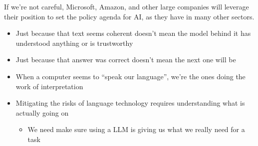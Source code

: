 \documentclass[25pt,a4paper,landscape,headrule,footrule,xetex]{foils}
\let\oldbibliography
\renewcommand{}[1]{
  \begingroup
  \renewcommand{\section}[2]{} %
  \oldbibliography{#1} %
  \endgroup
}
\begin{document}
If we’re not careful, Microsoft, Amazon, and other large companies will leverage their position to set the policy agenda for AI, as they have in many other sectors.





\begin{itemize}
\item  Just because that text seems coherent doesn’t mean the model behind it has
understood anything or is trustworthy
\item  Just because that answer was correct doesn’t mean the next one will be
\item  When a computer seems to “speak our language”, we’re the ones
doing the work of interpretation
\item Mitigating the risks of language technology requires understanding what is actually going on
  \begin{itemize}
  \item We need make sure using a LLM is giving us what we really need for a task
  \end{itemize}
\end{itemize}




\end{document}
